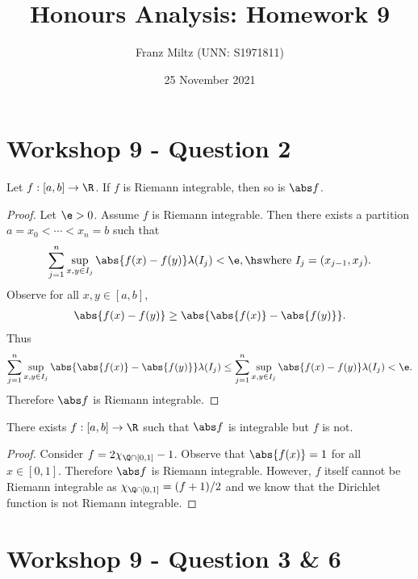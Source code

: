 \documentclass{article}
\begin{document}
\title{Honours Analysis: Homework 9}
\author{Franz Miltz (UNN: S1971811)}
\date{25 November 2021}
\maketitle

\section*{Workshop 9 - Question 2}

\begin{claim*}
   Let $f:[a,b]\to\R$. If $f$ is Riemann integrable, then so is $\abs f$.
\end{claim*}
\begin{proof}
   Let $\e>0$. Assume $f$ is Riemann integrable. Then there exists a partition
   $a=x_0<\cdots<x_n=b$ such that 
   \begin{align*}
      \sum_{j=1}^n \sup_{x,y\in I_j} \abs{f(x) - f(y)} \lambda(I_j) < \e,\hs 
      \text{where }I_j = (x_{j-1}, x_j).
   \end{align*}
   Observe for all $x,y\in[a,b]$,
   \begin{align*}
      \abs{f(x)-f(y)} \geq \abs{\abs{f(x)} - \abs{f(y)}}.
   \end{align*}
   Thus 
   \begin{align*}
      \sum_{j=1}^n \sup_{x,y\in I_j} \abs{\abs{f(x)} - \abs{f(y)}} \lambda(I_j)
      \leq \sum_{j=1}^n \sup_{x,y\in I_j} \abs{f(x) - f(y)} \lambda(I_j) < \e.
   \end{align*}
   Therefore $\abs f$ is Riemann integrable.
\end{proof}

\begin{claim*}
   There exists $f:[a,b]\to\R$ such that $\abs f$ is integrable but $f$ is not.
\end{claim*}
\begin{proof}
   Consider $f = 2\chi_{\Q\cap[0,1]}-1$. Observe that $\abs{f(x)} = 1$ for all $x\in[0,1]$.
   Therefore $\abs f$ is Riemann integrable. However, $f$ itself cannot be Riemann integrable 
   as $\chi_{\Q\cap[0,1]} = (f+1)/2$ and we know that the Dirichlet function is not Riemann
   integrable.
\end{proof}

\section*{Workshop 9 - Question 3 \& 6}
\end{document}
